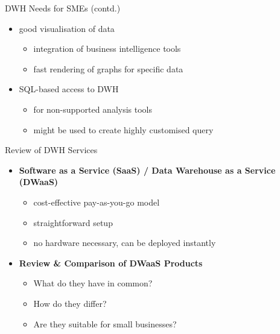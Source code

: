 \documentclass[aspectratio=169]{beamer}
\begin{document}
  \begin{frame}{DWH Needs for SMEs (contd.)}
    \begin{itemize}
      \item good visualisation of data
      \begin{itemize}
        \item integration of business intelligence tools
        \item fast rendering of graphs for specific data
      \end{itemize}
      \item SQL-based access to DWH
      \begin{itemize}
        \item for non-supported analysis tools
        \item might be used to create highly customised query
      \end{itemize}
    \end{itemize}
  \end{frame}

  \begin{frame}{Review of DWH Services}
    \begin{itemize}
      \item \textbf{Software as a Service (SaaS) / Data Warehouse as a Service (DWaaS)}
      	\begin{itemize}
      	   \item cost-effective pay-as-you-go model
           \item straightforward setup
           \item no hardware necessary, can be deployed instantly
      	\end{itemize}
      \item \textbf{Review \& Comparison of DWaaS Products}
        \begin{itemize}
           \item What do they have in common?
      	   \item How do they differ?
      	   \item Are they suitable for small businesses?
      	\end{itemize}
    \end{itemize}
  \end{frame}
\end{document}
